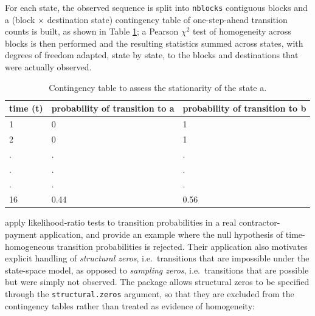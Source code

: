 \documentclass[
  nojss]{jss}
\begin{document}
For each state, the observed sequence is split into \texttt{nblocks} contiguous blocks and a (block \(\times\) destination state) contingency table of one-step-ahead transition counts is built, as shown in Table \ref{tab:stationarity}; a Pearson \(\chi^2\) test of homogeneity across blocks is then performed and the resulting statistics summed across states, with degrees of freedom adapted, state by state, to the blocks and destinations that were actually observed.

\begin{table}[h]
  \centering
  \begin{tabular}{l | l | l}
    \hline
  time (t) & probability of transition to a & probability of transition to b \\
    \hline  \hline
  1 & 0 & 1\\
  2 & 0 & 1\\
  . & . & . \\
  . & . & . \\
  . & . & . \\
  16 & 0.44 & 0.56\\
  \hline
\end{tabular}
\caption{Contingency table to assess the stationarity of the state a.}
\label{tab:stationarity}
\end{table}

\begin{CodeChunk}
\end{CodeChunk}

\cite{tranCarmichael2012} apply likelihood-ratio tests to transition probabilities in a real contractor-payment application, and provide an example where the null hypothesis of time-homogeneous transition probabilities is rejected. Their application also motivates explicit handling of \emph{structural zeros}, i.e.~transitions that are impossible under the state-space model, as opposed to \emph{sampling zeros}, i.e.~transitions that are possible but were simply not observed. The package allows structural zeros to be specified through the \texttt{structural.zeros} argument, so that they are excluded from the contingency tables rather than treated as evidence of homogeneity:
\end{document}
